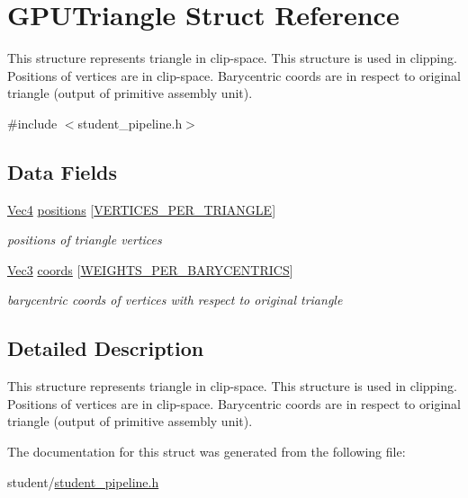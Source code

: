 \hypertarget{structGPUTriangle}{\section{G\-P\-U\-Triangle Struct Reference}
\label{structGPUTriangle}
}


This structure represents triangle in clip-\/space. This structure is used in clipping. Positions of vertices are in clip-\/space. Barycentric coords are in respect to original triangle (output of primitive assembly unit).  




{\ttfamily \#include $<$student\-\_\-pipeline.\-h$>$}

\subsection*{Data Fields}
\begin{DoxyCompactItemize}
\item 
\hypertarget{structGPUTriangle_af33d9eb5648bd43a8098159cd0691bb1}{\hyperlink{structVec4}{Vec4} \hyperlink{structGPUTriangle_af33d9eb5648bd43a8098159cd0691bb1}{positions} \mbox{[}\hyperlink{fwd_8h_a67df0e09b776eea53360bcc8f4a82ac9}{V\-E\-R\-T\-I\-C\-E\-S\-\_\-\-P\-E\-R\-\_\-\-T\-R\-I\-A\-N\-G\-L\-E}\mbox{]}}\label{structGPUTriangle_af33d9eb5648bd43a8098159cd0691bb1}

\begin{DoxyCompactList}\small\item\em positions of triangle vertices \end{DoxyCompactList}\item 
\hypertarget{structGPUTriangle_a1cd3fe2c1979f844528481ee336d4e09}{\hyperlink{structVec3}{Vec3} \hyperlink{structGPUTriangle_a1cd3fe2c1979f844528481ee336d4e09}{coords} \mbox{[}\hyperlink{fwd_8h_a6142f59143b2049a17b5318e8655ac86}{W\-E\-I\-G\-H\-T\-S\-\_\-\-P\-E\-R\-\_\-\-B\-A\-R\-Y\-C\-E\-N\-T\-R\-I\-C\-S}\mbox{]}}\label{structGPUTriangle_a1cd3fe2c1979f844528481ee336d4e09}

\begin{DoxyCompactList}\small\item\em barycentric coords of vertices with respect to original triangle \end{DoxyCompactList}\end{DoxyCompactItemize}


\subsection{Detailed Description}
This structure represents triangle in clip-\/space. This structure is used in clipping. Positions of vertices are in clip-\/space. Barycentric coords are in respect to original triangle (output of primitive assembly unit). 

The documentation for this struct was generated from the following file\-:\begin{DoxyCompactItemize}
\item 
student/\hyperlink{student__pipeline_8h}{student\-\_\-pipeline.\-h}\end{DoxyCompactItemize}
